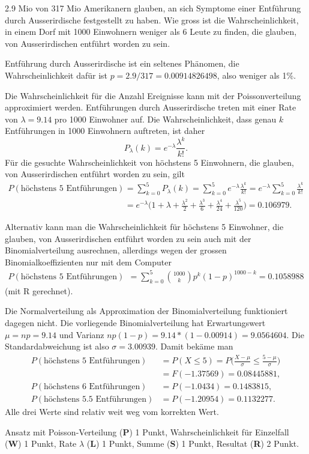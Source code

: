 2.9 Mio von 317 Mio Amerikanern glauben, an sich Symptome einer 
Entführung durch Ausserirdische festgestellt zu haben.
Wie gross ist die Wahrscheinlichkeit, in einem Dorf mit 1000
Einwohnern weniger als 6 Leute zu finden, die glauben, von
Ausserirdischen entführt worden zu sein.

\begin{loesung}
Entführung durch Ausserirdische ist ein seltenes Phänomen,
die Wahrscheinlichkeit dafür ist $p=2.9/317=0.00914826498$, also
weniger als 1\%.

Die Wahrscheinlichkeit für die Anzahl Ereignisse kann mit der
Poissonverteilung approximiert werden. Entführungen durch
Ausserirdische treten mit einer Rate von $\lambda = 9.14$ pro 1000 Einwohner
auf. Die Wahrscheinlichkeit, dass genau $k$ Entführungen in 1000
Einwohnern auftreten, ist daher
\[
P_\lambda(k)=e^{-\lambda}\frac{\lambda^k}{k!}.
\]
Für die gesuchte Wahrscheinlichkeit von höchstens 5 Einwohnern, die glauben,
von Ausserirdischen entführt worden zu sein, gilt
\begin{align*}
P(\text{höchstens 5 Entführungen})
&=
\sum_{k=0}^5P_\lambda(k)=\sum_{k=0}^5 e^{-\lambda}\frac{\lambda^k}{k!}
=e^{-\lambda}\sum_{k=0}^5\frac{\lambda^k}{k!}
\\
&=e^{-\lambda}\biggl(
1+\lambda+\frac{\lambda^2}{2}+\frac{\lambda^3}{6}+\frac{\lambda^4}{24}+\frac{\lambda^5}{120}
\biggr)
=0.106979.
\end{align*}

Alternativ kann man die Wahrscheinlichkeit für höchstens 5 Einwohner, die
glauben, von Ausserirdischen entführt worden zu sein auch mit der
Binomialverteilung ausrechnen, allerdings wegen der grossen
Binomialkoeffizienten nur mit dem Computer
\begin{align*}
P(\text{höchstens 5 Entführungen})
&=
\sum_{k=0}^5\binom{1000}{k}p^k(1-p)^{1000-k}
=0.1058988
\end{align*}
(mit R gerechnet).

Die Normalverteilung als Approximation der Binomialverteilung funktioniert
dagegen nicht. Die vorliegende Binomialverteilung hat Erwartungswert
$\mu = np=9.14$ und Varianz $np(1-p)=9.14 * (1-0.00914)=9.0564604$.
Die Standardabweichung ist also $\sigma = 3.00939$. Damit bekäme man
\begin{align*}
P(\text{höchstens 5 Entführungen})
&=
P(X\le 5)=P\biggl(\frac{X-\mu}{\sigma}\le \frac{5-\mu}{\sigma}\biggr)\\
&=F(-1.37569)=0.08445881,
\\
P(\text{höchstens 6 Entführungen})
&=P(-1.0434)=0.1483815,
\\
P(\text{höchstens 5.5 Entführungen})
&=P(-1.20954)=0.1132277.
\end{align*}
Alle drei Werte sind relativ weit weg vom korrekten Wert.
\end{loesung}

\begin{bewertung}
Ansatz mit Poisson-Verteilung ({\bf P}) 1 Punkt,
Wahrscheinlichkeit für Einzelfall ({\bf W}) 1 Punkt,
Rate $\lambda$ ({\bf L}) 1 Punkt,
Summe ({\bf S}) 1 Punkt,
Resultat ({\bf R}) 2 Punkt.
\end{bewertung}

